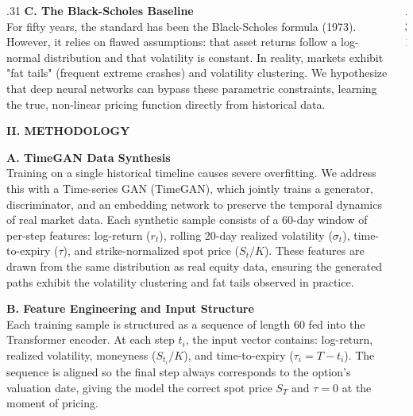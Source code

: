 \documentclass[final]{beamer}
\begin{document}
\begin{frame}[fragile]{}
\begin{columns}[t]
\begin{column}{.31\linewidth}
        \textbf{C. The Black-Scholes Baseline}\\
        For fifty years, the standard has been the Black-Scholes formula (1973). However, it relies on flawed assumptions: that asset returns follow a log-normal distribution and that volatility is constant. In reality, markets exhibit "fat tails" (frequent extreme crashes) and volatility clustering. We hypothesize that deep neural networks can bypass these parametric constraints, learning the true, non-linear pricing function directly from historical data.
        \vspace{1.2em}

        {\Large \textbf{II. METHODOLOGY}}
        \vspace{0.5em}

        \textbf{A. TimeGAN Data Synthesis}\\
        Training on a single historical timeline causes severe overfitting. We address this with a Time-series GAN (TimeGAN), which jointly trains a generator, discriminator, and an embedding network to preserve the temporal dynamics of real market data. Each synthetic sample consists of a 60-day window of per-step features: log-return ($r_t$), rolling 20-day realized volatility ($\sigma_t$), time-to-expiry ($\tau$), and strike-normalized spot price ($S_t/K$). These features are drawn from the same distribution as real equity data, ensuring the generated paths exhibit the volatility clustering and fat tails observed in practice.
        \vspace{0.5em}

        \textbf{B. Feature Engineering and Input Structure}\\
        Each training sample is structured as a sequence of length 60 fed into the Transformer encoder. At each step $t_i$, the input vector contains: log-return, realized volatility, moneyness ($S_{t_i}/K$), and time-to-expiry ($\tau_i = T - t_i$). The sequence is aligned so the final step always corresponds to the option's valuation date, giving the model the correct spot price $S_T$ and $\tau = 0$ at the moment of pricing.

    \end{column}

    \begin{column}{.31\linewidth}


\end{column}
\end{columns}
\end{frame}
\end{document}
